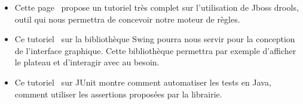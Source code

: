 \begin{itemize}
		\item Cette page~\cite{ref6} propose un tutoriel très complet sur l'utilisation de Jboss drools, outil qui nous permettra de concevoir notre moteur de règles.
		\\[0.7\baselineskip]

		\item Ce tutoriel~\cite{ref7} sur la bibliothèque Swing pourra nous servir pour la conception de l'interface graphique. Cette bibliothèque 
		permettra par exemple d'afficher le plateau et d'interagir avec au besoin.
		\\[0.7\baselineskip]

		\item Ce tutoriel~\cite{ref8} sur JUnit montre comment automatiser les tests en Java, comment utiliser les assertions proposées par la librairie. 

		\\[0.7\baselineskip]

	\end{itemize}